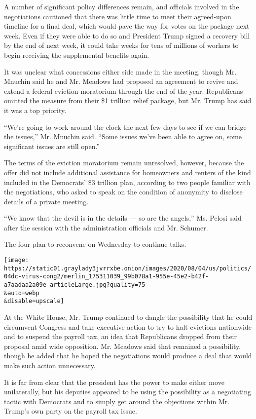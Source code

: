 A number of significant policy differences remain, and officials
involved in the negotiations cautioned that there was little time to
meet their agreed-upon timeline for a final deal, which would pave the
way for votes on the package next week. Even if they were able to do so
and President Trump signed a recovery bill by the end of next week, it
could take weeks for tens of millions of workers to begin receiving the
supplemental benefits again.

It was unclear what concessions either side made in the meeting, though
Mr. Mnuchin said he and Mr. Meadows had proposed an agreement to revive
and extend a federal eviction moratorium through the end of the year.
Republicans omitted the measure from their \$1 trillion relief package,
but Mr. Trump has said it was a top priority.

``We're going to work around the clock the next few days to see if we
can bridge the issues,'' Mr. Mnuchin said. ``Some issues we've been able
to agree on, some significant issues are still open.''

The terms of the eviction moratorium remain unresolved, however, because
the offer did not include additional assistance for homeowners and
renters of the kind included in the Democrats' \$3 trillion plan,
according to two people familiar with the negotiations, who asked to
speak on the condition of anonymity to disclose details of a private
meeting.

``We know that the devil is in the details --- so are the angels,'' Ms.
Pelosi said after the session with the administration officials and Mr.
Schumer.

The four plan to reconvene on Wednesday to continue talks.

\texttt{[image: https://static01.graylady3jvrrxbe.onion/images/2020/08/04/us/politics/04dc-virus-cong2/merlin\_175311039\_99b078a1-955e-45e2-b42f-a7aadaa2a09e-articleLarge.jpg?quality=75\\\&auto=webp\\\&disable=upscale]}

At the White House, Mr. Trump continued to dangle the possibility that
he could circumvent Congress and take executive action to try to halt
evictions nationwide and to suspend the payroll tax, an idea that
Republicans dropped from their proposal amid wide opposition. Mr.
Meadows said that remained a possibility, though he added that he hoped
the negotiations would produce a deal that would make such action
unnecessary.

It is far from clear that the president has the power to make either
move unilaterally, but his deputies appeared to be using the possibility
as a negotiating tactic with Democrats and to simply get around the
objections within Mr. Trump's own party on the payroll tax issue.


